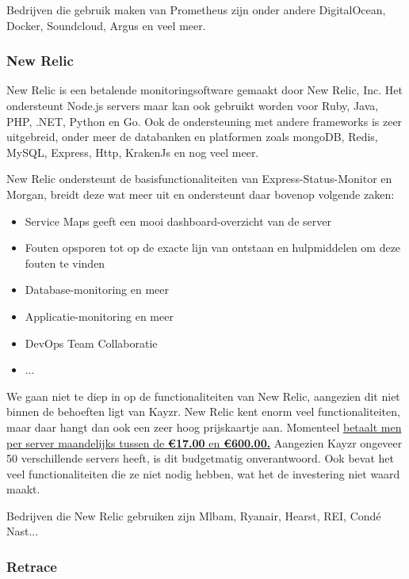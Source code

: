 Bedrijven die gebruik maken van Prometheus zijn onder andere DigitalOcean, Docker, Soundcloud, Argus en veel meer.

\subsubsection{New Relic}
\label{sec:newRelic}

New Relic is een betalende monitoringsoftware gemaakt door New Relic, Inc. Het ondersteunt Node.js servers maar kan ook gebruikt worden voor Ruby, Java, PHP, .NET, Python en Go. Ook de ondersteuning met andere frameworks is zeer uitgebreid, onder meer de databanken en platformen zoals mongoDB, Redis, MySQL, Express, Http, KrakenJs en nog veel meer.  

New Relic ondersteunt de basisfunctionaliteiten van Express-Status-Monitor en Morgan, breidt deze wat meer uit en ondersteunt daar bovenop volgende zaken:

\begin{itemize}
	\item Service Maps geeft een mooi dashboard-overzicht van de server
	\item Fouten opsporen tot op de exacte lijn van ontstaan en hulpmiddelen om deze fouten te vinden
	\item Database-monitoring en meer
	\item Applicatie-monitoring en meer
	\item DevOps Team Collaboratie
	\item ...
\end{itemize}

We gaan niet te diep in op de functionaliteiten van New Relic, aangezien dit niet binnen de behoeften ligt van Kayzr. New Relic kent enorm veel functionaliteiten, maar daar hangt dan ook een zeer hoog prijskaartje aan. Momenteel \href{https://newrelic.com/products/browser-monitoring/pricing}{betaalt men per server maandelijks tussen de \textbf{\euro17.00} en \textbf{\euro600.00.}}  Aangezien Kayzr ongeveer 50 verschillende servers heeft, is dit budgetmatig onverantwoord. Ook bevat het veel functionaliteiten die ze niet nodig hebben, wat het de investering niet waard maakt.

Bedrijven die New Relic gebruiken zijn Mlbam, Ryanair, Hearst, REI, Condé Nast...

\subsubsection{Retrace}
\label{sec:retrace}


